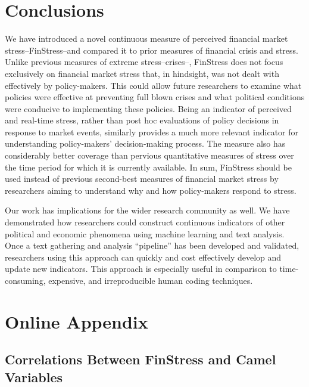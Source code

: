 \documentclass[]{article}
\begin{document}
\section{Conclusions}\label{conclusions}

We have introduced a novel continuous measure of perceived financial market stress--FinStress--and compared it to prior measures of financial crisis and stress. Unlike previous measures of extreme stress--crises--, FinStress does not focus exclusively on financial market stress that, in hindsight, was not dealt with effectively by policy-makers. This could allow future researchers to examine what policies were effective at preventing full blown crises and what political conditions were conducive to implementing these policies. Being an indicator of perceived and real-time stress, rather than post hoc evaluations of policy decisions in response to market events, similarly provides a much more relevant indicator for understanding policy-makers' decision-making process. The measure also has considerably better coverage than pervious quantitative measures of stress over the time period for which it is currently available. In sum, FinStress should be used instead of previous second-best measures of financial market stress by researchers aiming to understand why and how policy-makers respond to stress.

Our work has implications for the wider research community as well. We have demonstrated how researchers could construct continuous indicators of other political and economic phenomena using machine learning and text analysis. Once a text gathering and analysis ``pipeline'' \citep{Leek2015} has been developed and validated, researchers using this approach can quickly and cost effectively develop and update new indicators. This approach is especially useful in comparison to time-consuming, expensive, and irreproducible human coding techniques.




\pagebreak
\renewcommand{\thepage}{A-\arabic{page}}\setcounter{page}{1}
\renewcommand{\thesection}{Appendix \arabic{section}}\setcounter{section}{0}
\renewcommand{\thetable}{A-\arabic{table}}\setcounter{table}{0}\clearpage

\section*{Online Appendix}

\subsection{Correlations Between FinStress and Camel Variables}
\end{document}

